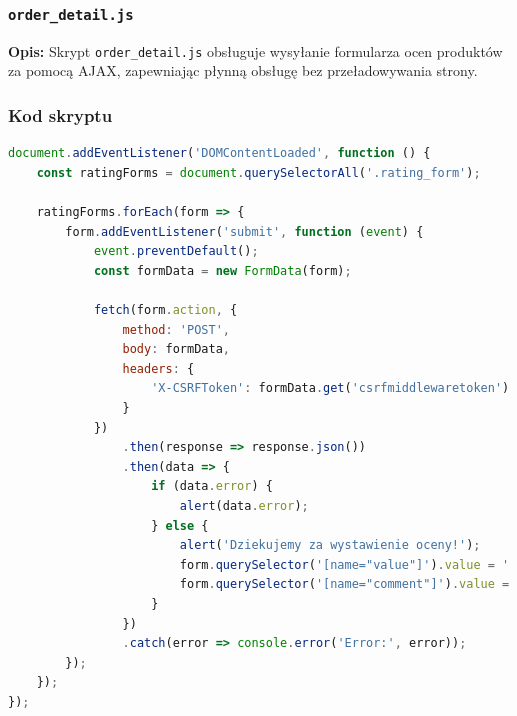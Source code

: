 \documentclass[12pt,a4paper,oneside]{article}
\theoremstyle{definition}
\numberwithin{equation}{section}
\begin{document}
\subsubsection*{\texttt{order\_detail.js}}

\textbf{Opis:}  
Skrypt \texttt{order\_detail.js} obsługuje wysyłanie formularza ocen produktów za pomocą AJAX, zapewniając płynną obsługę bez przeładowywania strony. 

\subsubsection*{Kod skryptu}
\begin{lstlisting}[language=JavaScript, caption=Skrypt \texttt{order\_detail.js}]
document.addEventListener('DOMContentLoaded', function () {
    const ratingForms = document.querySelectorAll('.rating_form');

    ratingForms.forEach(form => {
        form.addEventListener('submit', function (event) {
            event.preventDefault();
            const formData = new FormData(form);

            fetch(form.action, {
                method: 'POST',
                body: formData,
                headers: {
                    'X-CSRFToken': formData.get('csrfmiddlewaretoken')
                }
            })
                .then(response => response.json())
                .then(data => {
                    if (data.error) {
                        alert(data.error);
                    } else {
                        alert('Dziekujemy za wystawienie oceny!');
                        form.querySelector('[name="value"]').value = '';
                        form.querySelector('[name="comment"]').value = '';
                    }
                })
                .catch(error => console.error('Error:', error));
        });
    });
});
\end{lstlisting}
\end{document}
